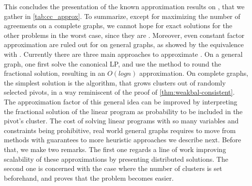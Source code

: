\medskip

This concludes the presentation of the known approximation results on \pcc{}, that we gather in
\autoref{tab:cc_approx}.
To summarize, except for maximizing the number of agreements on a complete graphs, we cannot hope
for exact solutions for the other problems in the worst case, since they are \APXh{}. Moreover, even
constant factor approximation are ruled out for \mind{} on general graphs, as showed by the
equivalence with \mmc{}.
Currently there are three main approaches to approximate \mind{}. On a general graph,
one first solve the canonical LP, and use the \regionGrow{} method to round the fractional solution,
resulting in an $O(log n)$ approximation. On complete graphs, the simplest solution is the
\ccpivot{} algorithm, that grows clusters out of randomly selected pivots, in a way reminiscent of
the proof of \autoref{thm:weakbal-consistent}. The approximation factor of this general idea can be
improved by interpreting the fractional solution of the linear program as probability to be included
in the pivot's cluster. The cost of solving linear programs with so many variables and constraints
being prohibitive, real world general graphs requires to move from methods with guarantees to more
heuristic approaches we describe next. Before that, we make two remarks. The first one regards a
line of work improving scalability of these approximations by presenting distributed solutions. The
second one is concerned with the case where the number of clusters is set beforehand, and proves
that the problem becomes easier.


